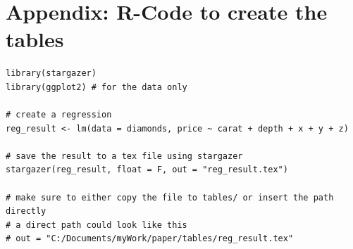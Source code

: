 \documentclass[12pt,a4paper]{article}
\begin{document}





\newpage

\printbibliography

\newpage

\section{Appendix: R-Code to create the tables}
\label{sec:appendix}
\begin{verbatim}
library(stargazer)
library(ggplot2) # for the data only

# create a regression
reg_result <- lm(data = diamonds, price ~ carat + depth + x + y + z)

# save the result to a tex file using stargazer
stargazer(reg_result, float = F, out = "reg_result.tex")

# make sure to either copy the file to tables/ or insert the path directly
# a direct path could look like this
# out = "C:/Documents/myWork/paper/tables/reg_result.tex"
\end{verbatim}

\newpage

\end{document}
